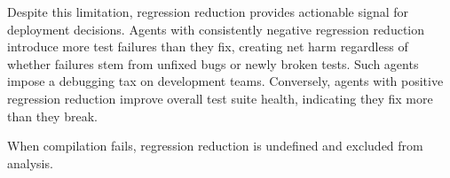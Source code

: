 Despite this limitation, regression reduction provides actionable signal for deployment decisions. Agents with consistently negative regression reduction introduce more test failures than they fix, creating net harm regardless of whether failures stem from unfixed bugs or newly broken tests. Such agents impose a debugging tax on development teams. Conversely, agents with positive regression reduction improve overall test suite health, indicating they fix more than they break.

When compilation fails, regression reduction is undefined and excluded from analysis.
